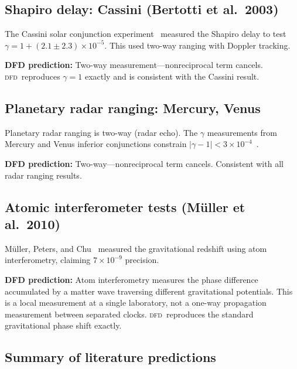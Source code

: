 \documentclass[aps,prl,twocolumn,superscriptaddress,showpacs]{revtex4-2}
\newcommand{\DFD}{\textsc{dfd}}
\begin{document}
\subsection{Shapiro delay: Cassini (Bertotti et al.\ 2003)}

The Cassini solar conjunction experiment~\cite{Bertotti2003}
measured the Shapiro delay to test $\gamma = 1 + (2.1\pm 2.3)
\times 10^{-5}$.  This used two-way ranging with Doppler tracking.

\textbf{DFD prediction:}  Two-way measurement---nonreciprocal
term cancels.  \DFD\ reproduces $\gamma = 1$ exactly and is
consistent with the Cassini result.

\subsection{Planetary radar ranging: Mercury, Venus}

Planetary radar ranging is two-way (radar echo).  The $\gamma$
measurements from Mercury and Venus inferior conjunctions
constrain $|\gamma - 1| < 3\times 10^{-4}$~\cite{Shapiro1971}.

\textbf{DFD prediction:}  Two-way---nonreciprocal term cancels.
Consistent with all radar ranging results.

\subsection{Atomic interferometer tests (M\"{u}ller et al.\ 2010)}

M\"{u}ller, Peters, and Chu~\cite{Mueller2010} measured the
gravitational redshift using atom interferometry, claiming
$7\times 10^{-9}$ precision.

\textbf{DFD prediction:}  Atom interferometry measures the phase
difference accumulated by a matter wave traversing different
gravitational potentials.  This is a local measurement at a
single laboratory, not a one-way propagation measurement between
separated clocks.  \DFD\ reproduces the standard gravitational
phase shift exactly.

\subsection{Summary of literature predictions}
\end{document}
